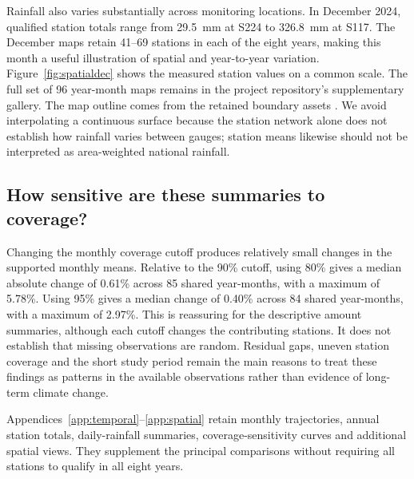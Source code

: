 
Rainfall also varies substantially across monitoring locations. In December 2024, qualified station totals range from 29.5~mm at S224 to 326.8~mm at S117. The December maps retain 41--69 stations in each of the eight years, making this month a useful illustration of spatial and year-to-year variation. Figure~\ref{fig:spatialdec} shows the measured station values on a common scale. The full set of 96 year-month maps remains in the project repository's supplementary gallery. The map outline comes from the retained boundary assets \cite{geo}. We avoid interpolating a continuous surface because the station network alone does not establish how rainfall varies between gauges; station means likewise should not be interpreted as area-weighted national rainfall.


\subsection{How sensitive are these summaries to coverage?}

Changing the monthly coverage cutoff produces relatively small changes in the supported monthly means. Relative to the 90\% cutoff, using 80\% gives a median absolute change of 0.61\% across 85 shared year-months, with a maximum of 5.78\%. Using 95\% gives a median change of 0.40\% across 84 shared year-months, with a maximum of 2.97\%. This is reassuring for the descriptive amount summaries, although each cutoff changes the contributing stations. It does not establish that missing observations are random. Residual gaps, uneven station coverage and the short study period remain the main reasons to treat these findings as patterns in the available observations rather than evidence of long-term climate change.

Appendices~\ref{app:temporal}--\ref{app:spatial} retain monthly trajectories, annual station totals, daily-rainfall summaries, coverage-sensitivity curves and additional spatial views. They supplement the principal comparisons without requiring all stations to qualify in all eight years.
